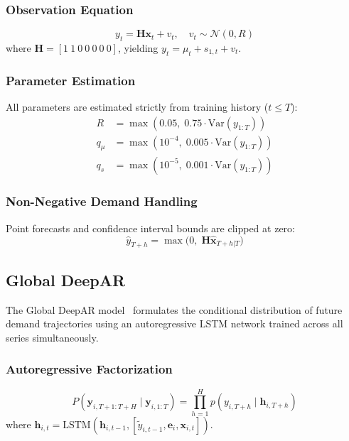 \documentclass[conference]{IEEEtran}
\begin{document}
\subsubsection{Observation Equation}
\begin{equation}
    y_t = \mathbf{H} \mathbf{x}_t + v_t, \quad v_t \sim \mathcal{N}(0, R)
\end{equation}
where $\mathbf{H} = [1\ 1\ 0\ 0\ 0\ 0\ 0]$, yielding $y_t = \mu_t + s_{1,t} + v_t$.

\subsubsection{Parameter Estimation}
All parameters are estimated strictly from training history ($t \leq T$):
\begin{align}
    R &= \max(0.05,\; 0.75 \cdot \text{Var}(y_{1:T})) \\
    q_\mu &= \max(10^{-4},\; 0.005 \cdot \text{Var}(y_{1:T})) \\
    q_s &= \max(10^{-5},\; 0.001 \cdot \text{Var}(y_{1:T}))
\end{align}

\subsubsection{Non-Negative Demand Handling}
Point forecasts and confidence interval bounds are clipped at zero:
\begin{equation}
    \hat{y}_{T+h} = \max\bigl(0,\; \mathbf{H} \hat{\mathbf{x}}_{T+h|T}\bigr)
\end{equation}

\subsection{Global DeepAR}

The Global DeepAR model~\cite{salinas2020deepar} formulates the conditional distribution of future demand trajectories using an autoregressive LSTM network trained across all series simultaneously.

\subsubsection{Autoregressive Factorization}
\begin{equation}
    P(\mathbf{y}_{i,T+1:T+H} \mid \mathbf{y}_{i,1:T}) = \prod_{h=1}^{H} p(y_{i,T+h} \mid \mathbf{h}_{i,T+h})
\end{equation}
where $\mathbf{h}_{i,t} = \text{LSTM}(\mathbf{h}_{i,t-1}, [\tilde{y}_{i,t-1}, \mathbf{e}_i, \mathbf{x}_{i,t}])$.
\end{document}
